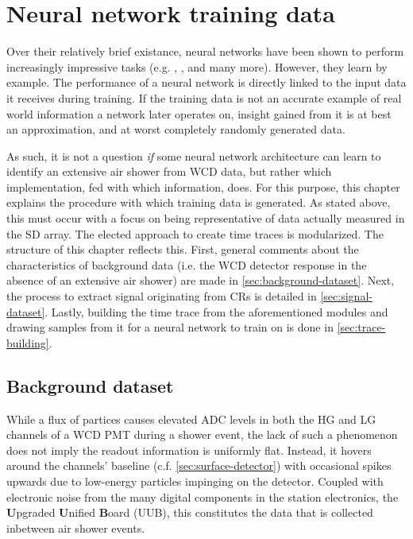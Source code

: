 

\chapter{Neural network training data}
\label{chap:neural-network-data}

Over their relatively brief existance, neural networks have been shown to perform increasingly impressive tasks (e.g.  \cite{openai2019dota}, \cite{openai2023gpt4}, 
and many more). However, they learn by example. The performance of a neural network is directly linked to the input data it receives during training. If the 
training data is not an accurate example of real world information a network later operates on, insight gained from it is at best an approximation, and at worst
completely randomly generated data. 

As such, it is not a question \textit{if} some neural network architecture can learn to identify an extensive air shower from WCD data, but rather which 
implementation, fed with which information, does. For this purpose, this chapter explains the procedure with which training data is generated. As stated above, this
must occur with a focus on being representative of data actually measured in the SD array. The elected approach to create time traces is modularized. The structure
of this chapter reflects this. First, general comments about the characteristics of background data (i.e. the WCD detector response in the absence of an extensive 
air shower) are made in \autoref{sec:background-dataset}. Next, the process to extract signal originating from CRs is detailed in \autoref{sec:signal-dataset}.
Lastly, building the time trace from the aforementioned modules and drawing samples from it for a neural network to train on is done in \autoref{sec:trace-building}.

\section{Background dataset}
\label{sec:background-dataset}

While a flux of partices causes elevated ADC levels in both the HG and LG channels of a WCD PMT during a shower event, the lack of such a phenomenon does not imply 
the readout information is uniformly flat. Instead, it hovers around the channels' baseline (c.f. \autoref{sec:surface-detector}) with occasional spikes upwards 
due to low-energy particles impinging on the detector. Coupled with electronic noise from the many digital components in the station electronics, the 
\textbf{U}pgraded \textbf{U}nified \textbf{B}oard (UUB), this constitutes the data that is collected inbetween air shower events.

